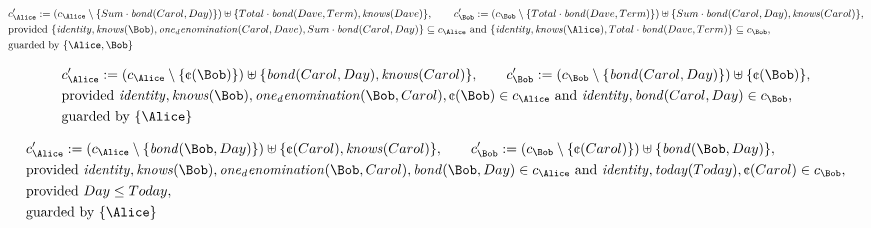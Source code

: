 \begin{align*}
&
c'_
{
\Alice
}
 := 
(c_
{
\Alice
}
 \setminus 
\{
Sum
\cdot
\mathit{
bond
}
(
Carol
,
Day
)
\}
) \uplus 
\{
Total
\cdot
\mathit{
bond
}
(
Dave
,
Term
)
,
\mathit{
knows
}
(
Dave
)
\}
, \qquad 
c'_
{
\Bob
}
 := 
(c_
{
\Bob
}
 \setminus 
\{
Total
\cdot
\mathit{
bond
}
(
Dave
,
Term
)
\}
) \uplus 
\{
Sum
\cdot
\mathit{
bond
}
(
Carol
,
Day
)
,
\mathit{
knows
}
(
Carol
)
\}
,\\
&
\text{provided } 
\{
\mathit{
identity
}
,
\mathit{
knows
}
(
\Bob
)
,
\mathit{
one_denomination
}
(
Carol
,
Dave
)
,
Sum
\cdot
\mathit{
bond
}
(
Carol
,
Day
)
\}
 \subseteq c_
{
\Alice
}
 \text{ and } 
\{
\mathit{
identity
}
,
\mathit{
knows
}
(
\Alice
)
,
Total
\cdot
\mathit{
bond
}
(
Dave
,
Term
)
\}
 \subseteq c_
{
\Bob
}
,\\
&
\text{guarded by } \{
\Alice
,
\Bob
\}
\end{align*}

\begin{align*}
&
c'_
{
\Alice
}
 := 
(c_
{
\Alice
}
 \setminus 
\{
\text{\textcent}
(
\Bob
)
\}
) \uplus 
\{
\mathit{
bond
}
(
Carol
,
Day
)
,
\mathit{
knows
}
(
Carol
)
\}
, \qquad 
c'_
{
\Bob
}
 := 
(c_
{
\Bob
}
 \setminus 
\{
\mathit{
bond
}
(
Carol
,
Day
)
\}
) \uplus 
\{
\text{\textcent}
(
\Bob
)
\}
,\\
&
\text{provided } 
\mathit{
identity
}
,
\mathit{
knows
}
(
\Bob
)
,
\mathit{
one_denomination
}
(
\Bob
,
Carol
)
,
\text{\textcent}
(
\Bob
)
 \in c_
{
\Alice
}
 \text{ and } 
\mathit{
identity
}
,
\mathit{
bond
}
(
Carol
,
Day
)
 \in c_
{
\Bob
}
,\\
&
\text{guarded by } \{
\Alice
\}
\end{align*}

\begin{align*}
&
c'_
{
\Alice
}
 := 
(c_
{
\Alice
}
 \setminus 
\{
\mathit{
bond
}
(
\Bob
,
Day
)
\}
) \uplus 
\{
\text{\textcent}
(
Carol
)
,
\mathit{
knows
}
(
Carol
)
\}
, \qquad 
c'_
{
\Bob
}
 := 
(c_
{
\Bob
}
 \setminus 
\{
\text{\textcent}
(
Carol
)
\}
) \uplus 
\{
\mathit{
bond
}
(
\Bob
,
Day
)
\}
,\\
&
\text{provided } 
\mathit{
identity
}
,
\mathit{
knows
}
(
\Bob
)
,
\mathit{
one_denomination
}
(
\Bob
,
Carol
)
,
\mathit{
bond
}
(
\Bob
,
Day
)
 \in c_
{
\Alice
}
 \text{ and } 
\mathit{
identity
}
,
\mathit{
today
}
(
Today
)
,
\text{\textcent}
(
Carol
)
 \in c_
{
\Bob
}
,\\
&
\text{provided } 
Day
\le
Today
,\\
&
\text{guarded by } \{
\Alice
\}
\end{align*}
